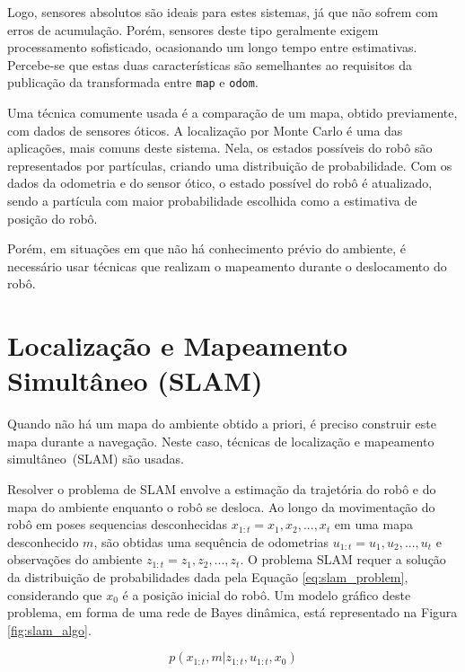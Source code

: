 \documentclass[repeatfields,xlists,xpacks,oneside,yearsonly]{ufrgscca}
\begin{document}
Logo, sensores absolutos são ideais para estes sistemas, já que não
sofrem com erros de acumulação. Porém, sensores deste tipo geralmente
exigem processamento sofisticado, ocasionando um longo tempo entre
estimativas. Percebe-se que estas duas características são
semelhantes ao requisitos da publicação da transformada entre
\texttt{map} e \texttt{odom}.

Uma técnica comumente usada é a comparação de um mapa, obtido
previamente, com dados de sensores óticos. A localização por Monte
Carlo é uma das aplicações, mais comuns deste sistema. Nela, os
estados possíveis do robô são representados por partículas, criando
uma distribuição de probabilidade. Com os dados da odometria e do
sensor ótico, o estado possível do robô é atualizado, sendo a
partícula com maior probabilidade escolhida como a estimativa de
posição do robô.

Porém, em situações em que não há conhecimento prévio do ambiente, é
necessário usar técnicas que realizam o mapeamento durante o
deslocamento do robô.

\section{Localização e Mapeamento Simultâneo (SLAM)}

Quando não há um mapa do ambiente obtido a priori, é preciso
construir este mapa durante a navegação. Neste caso, técnicas de
localização e mapeamento simultâneo~(SLAM) são usadas.

Resolver o problema de SLAM envolve a estimação da trajetória do robô
e do mapa do ambiente enquanto o robô se desloca. Ao longo da
movimentação do robô em poses sequencias desconhecidas $x_{1:t} = {
            x_1, x_2, ..., x_t }$ em uma mapa desconhecido $m$, são obtidas uma
sequência de odometrias $u_{1:t} = {u_1, u_2, ..., u_t}$ e
observações do ambiente $z_{1:t} = {z_1, z_2, ..., z_t}$. O problema
SLAM requer a solução da distribuição de probabilidades dada pela
Equação \ref{eq:slam_problem}, considerando que $x_0$ é a posição
inicial do robô. Um modelo gráfico deste problema, em forma de uma
rede de Bayes dinâmica, está representado na Figura
\ref{fig:slam_algo}.

\begin{equation}
    \label{eq:slam_problem}
    p(x_{1:t}, m | z_{1:t}, u_{1:t}, x_0)
\end{equation}
\end{document}
